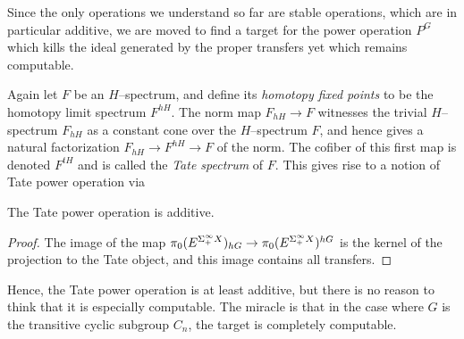 Since the only operations we understand so far are stable operations, which are in particular additive, we are moved to find a target for the power operation $P^G$ which kills the ideal generated by the proper transfers yet which remains computable.

\begin{definition}
Again let $F$ be an $H$--spectrum, and define its \textit{homotopy fixed points} to be the homotopy limit spectrum $F^{hH}$.  The norm map $F_{hH} \to F$ witnesses the trivial $H$--spectrum $F_{hH}$ as a constant cone over the $H$--spectrum $F$, and hence gives a natural factorization $F_{hH} \to F^{hH} \to F$ of the norm.  The cofiber of this first map is denoted $F^{tH}$ and is called the \textit{Tate spectrum} of $F$.  This gives rise to a notion of Tate power operation via
\begin{center}
\end{center}
\end{definition}

\begin{lemma}
The Tate power operation is additive.
\end{lemma}
\begin{proof}
The image of the map $\pi_0 (E^{\Sigma^\infty_+ X})_{hG} \to \pi_0 (E^{\Sigma^\infty_+ X})^{hG}$ is the kernel of the projection to the Tate object, and this image contains all transfers.
\end{proof}

Hence, the Tate power operation is at least additive, but there is no reason to think that it is especially computable.  The miracle is that in the case where $G$ is the transitive cyclic subgroup $C_n$, the target is completely computable.

